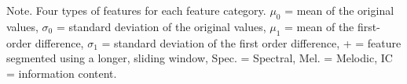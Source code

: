 \begin{table}[h]
\begin{threeparttable}
\begin{tabular*}{\textwidth}{@{\extracolsep{\fill}}llllll@{}}
\end{tabular*}
\begin{tablenotes}
\small
\item Note. Four types of features for each feature category. $\mu_0$ = mean of the original values, $\sigma_0$ = standard deviation of the original values, $\mu_1$ = mean of the first-order difference, $\sigma_1$ = standard deviation of the first order difference, + = feature segmented using a longer, sliding window, Spec. = Spectral, Mel. = Melodic, IC = information content.
\end{tablenotes}
\end{threeparttable}
\end{table}